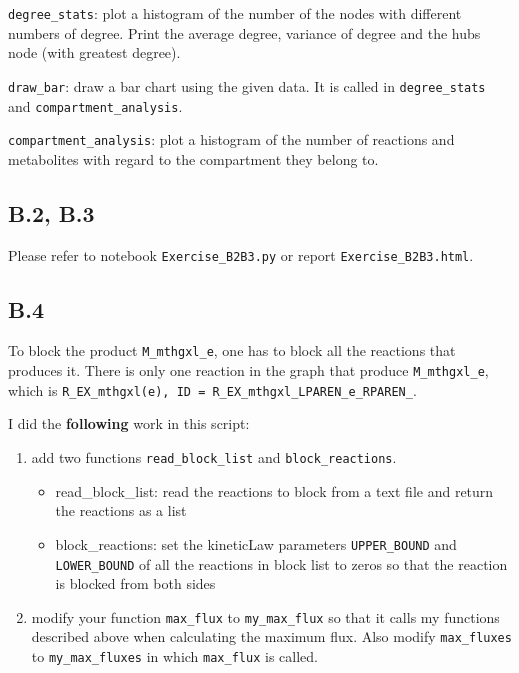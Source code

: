 \documentclass[]{article}
\begin{document}
\texttt{degree\_stats}: plot a histogram of the number of the nodes with
different numbers of degree. Print the average degree, variance of
degree and the hubs node (with greatest degree).

\texttt{draw\_bar}: draw a bar chart using the given data. It is called
in \texttt{degree\_stats} and \texttt{compartment\_analysis}.

\texttt{compartment\_analysis}: plot a histogram of the number of
reactions and metabolites with regard to the compartment they belong to.

\hypertarget{header-n38}{%
\subsection{B.2, B.3}\label{header-n38}}

Please refer to notebook \texttt{Exercise\_B2B3.py} or report
\texttt{Exercise\_B2B3.html}.

\hypertarget{header-n41}{%
\subsection{B.4}\label{header-n41}}

To block the product \texttt{M\_mthgxl\_e}, one has to block all the
reactions that produces it. There is only one reaction in the graph that
produce \texttt{M\_mthgxl\_e}, which is
\texttt{R\_EX\_mthgxl(e),\ ID\ =\ R\_EX\_mthgxl\_LPAREN\_e\_RPAREN\_}.

I did the \textbf{following} work in this script:

\begin{enumerate}
\def\labelenumi{\arabic{enumi}.}
\item
  add two functions \texttt{read\_block\_list} and
  \texttt{block\_reactions}.

  \begin{itemize}
  \item
    read\_block\_list: read the reactions to block from a text file and
    return the reactions as a list
  \item
    block\_reactions: set the kineticLaw parameters
    \texttt{UPPER\_BOUND} and \texttt{LOWER\_BOUND} of all the reactions
    in block list to zeros so that the reaction is blocked from both
    sides
  \end{itemize}
\item
  modify your function \texttt{max\_flux} to \texttt{my\_max\_flux} so
  that it calls my functions described above when calculating the
  maximum flux. Also modify \texttt{max\_fluxes} to
  \texttt{my\_max\_fluxes} in which \texttt{max\_flux} is called.
\end{enumerate}
\end{document}
